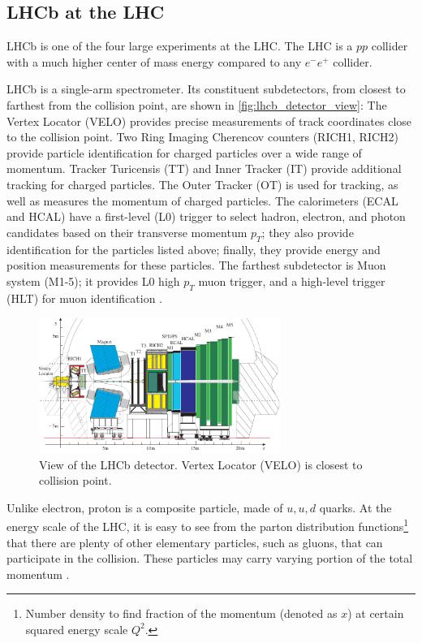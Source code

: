 \subsection{LHCb at the LHC}
LHCb is one of the four large experiments at the LHC.
The LHC is a $pp$ collider with a much higher center of mass energy compared to
any $e^-e^+$ collider.

LHCb is a single-arm spectrometer.
Its constituent subdetectors, from closest to farthest from the collision point,
are shown in \autoref{fig:lhcb_detector_view}:
The Vertex Locator (VELO) provides precise measurements of track coordinates
close to the collision point.
Two Ring Imaging Cherencov counters (RICH1, RICH2) provide particle
identification for charged particles over a wide range of momentum.
Tracker Turicensis (TT) and Inner Tracker (IT) provide additional tracking for
charged particles.
The Outer Tracker (OT) is used for tracking, as well as measures the momentum
of charged particles.
The calorimeters (ECAL and HCAL) have a first-level (L0) trigger to select
hadron, electron, and photon candidates based on their transverse momentum
$p_T$;
they also provide identification for the particles listed above;
finally, they provide energy and position measurements for these particles.
The farthest subdetector is Muon system (M1-5);
it provides L0 high $p_T$ muon trigger, and a high-level trigger (HLT) for muon
identification \cite{LHCb:2008}.

\begin{figure}[ht]
    \centering
    \includegraphics[width=0.7\textwidth]{figs/lhcb_detector_view.pdf}
    \caption{
        View of the LHCb detector.
        Vertex Locator (VELO) is closest to collision point.
    }
    \label{fig:lhcb_detector_view}
\end{figure}

Unlike electron, proton is a composite particle, made of $u, u, d$ quarks.
At the energy scale of the LHC, it is easy to see from the parton distribution
functions\footnote{
    Number density to find fraction of the momentum (denoted as $x$) at certain
    squared energy scale $Q^2$.
} that there are plenty of other elementary particles, such as gluons, that can
participate in the collision.
These particles may carry varying portion of the total
momentum \cite{Ball:2014uwa}.

